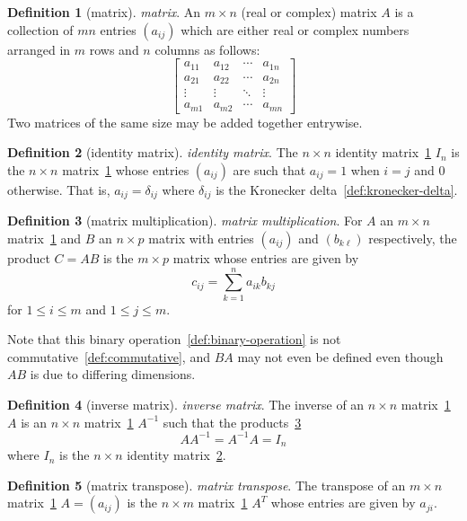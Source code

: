 \documentclass[12pt,a4paper]{article}
\theoremstyle{definition}
\newtheorem{definition}{Definition}
\begin{document}
\begin{definition}[matrix]\label{def:matrix}
\emph{matrix}. An $m\times n$ (real or complex) matrix $A$ is a collection of $mn$ entries $(a_{ij})$ which are either real or complex numbers arranged in $m$ rows and $n$ columns as follows: $$\begin{bmatrix}a_{11} & a_{12} & \cdots & a_{1n} \\ a_{21} & a_{22} & \cdots & a_{2n} \\ \vdots&\vdots &\ddots &\vdots \\ a_{m1} & a_{m2} &\cdots & a_{mn}\end{bmatrix}$$
Two matrices of the same size may be added together entrywise.
\end{definition}

\begin{definition}[identity matrix]\label{def:identity-matrix}
\emph{identity matrix}. The $n\times n$ identity matrix~\ref{def:matrix} $I_n$ is the $n\times n$ matrix~\ref{def:matrix} whose entries $(a_{ij})$ are such that $a_{ij}=1$ when $i=j$ and $0$ otherwise. That is, $a_{ij} = \delta_{ij}$ where $\delta_{ij}$ is the Kronecker delta~\ref{def:kronecker-delta}.
\end{definition}

\begin{definition}[matrix multiplication]\label{def:matrix-multiplication}
\emph{matrix multiplication}. For $A$ an $m\times n$ matrix~\ref{def:matrix} and $B$ an $n\times p$ matrix with entries $(a_{ij})$ and $(b_{k\ell})$ respectively, the product $C=AB$ is the $m\times p$ matrix whose entries are given by $$c_{ij} = \sum_{k=1}^n a_{ik}b_{kj}$$ for $1 \leq i \leq m$ and $1 \leq j \leq m$. 

Note that this binary operation~\ref{def:binary-operation} is not commutative~\ref{def:commutative}, and $BA$ may not even be defined even though $AB$ is due to differing dimensions.
\end{definition}

\begin{definition}[inverse matrix]\label{def:inverse-matrix}
\emph{inverse matrix}. The inverse of an $n\times n$ matrix~\ref{def:matrix} $A$ is an $n\times n$ matrix~\ref{def:matrix} $A^{-1}$ such that the products~\ref{def:matrix-multiplication} $$AA^{-1} = A^{-1}A = I_n$$ where $I_n$ is the $n\times n$ identity matrix~\ref{def:identity-matrix}.
\end{definition}

\begin{definition}[matrix transpose]\label{def:matrix-transpose}
\emph{matrix transpose}. The transpose of an $m\times n$ matrix~\ref{def:matrix} $A = (a_{ij})$ is the $n\times m$ matrix~\ref{def:matrix} $A^T$ whose entries are given by $a_{ji}$.
\end{definition}
\end{document}
